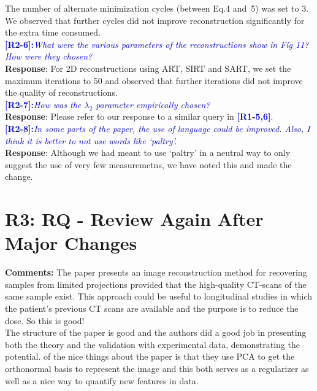\documentclass[11pt]{article}
\begin{document}
The number of alternate minimization cycles (between Eq.4 and~5) was set to 3. We observed that further cycles did not improve reconstruction significantly for the extra time consumed.
\\

\vspace{0.5cm}\textcolor{blue}{\textbf{[R2-6]:}\textit{What were the various parameters of the reconstructions show in Fig 11? How were they chosen?
}}\\

\textbf{Response}: For 2D reconstructions using ART, SIRT and SART, we set the maximum iterations to 50 and observed that further iterations did not improve the quality of reconstructions.\\

\vspace{0.5cm}\textcolor{blue}{\textbf{[R2-7]:}\textit{How was the $\lambda_2$ parameter empirically chosen?
}}\\

\textbf{Response}: Please refer to our response to a similar query in \textcolor{blue}{\textbf{[R1-5,6]}}.\\

\vspace{0.5cm}\textcolor{blue}{\textbf{[R2-8]:}\textit{In some parts of the paper, the use of language could be improved. Also, I think it is better to not use words like `paltry'.}}\\

\textbf{Response}: Although we had meant to use `paltry' in a neutral way to only suggest the use of very few measuremetns, we  have noted this and made the change.\\

\section{R3: RQ - Review Again After Major Changes}

\textbf{Comments:} The paper presents an image reconstruction method for recovering samples from limited projections provided that the high-quality CT-scans of the same sample exist. This approach could be useful to longitudinal studies in which the patient's previous CT scans are available and the purpose is to reduce the dose. So this is good!\\

The structure of the paper is good and the authors did a good job in presenting both the theory and the validation with experimental data, demonstrating the potential. of the nice things about the paper is that they use PCA to get the orthonormal basis to represent the image and this both serves as a regularizer as well as a nice way to quantify new features in data.
\\
\end{document}
